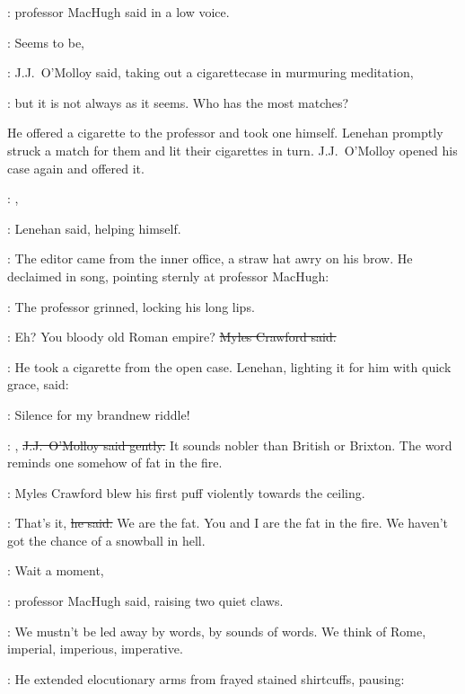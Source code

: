 :
professor MacHugh said in a low voice.

\jjom:
Seems to be,

:
J.J.~O'Molloy said,
taking out a cigarettecase in murmuring meditation,

\jjom:
but it is not always as it seems.
Who has the most matches?



He offered a cigarette to the professor and took one himself.
Lenehan promptly struck a match for them and lit their cigarettes in turn.
J.J.~O'Molloy opened his case again and offered it.

\lenehan:
,

:
Lenehan said,
helping himself.

:
The editor came from the inner office,
a straw hat awry on his brow.
He declaimed in song,
pointing sternly at professor MacHugh:



:
The professor grinned,
locking his long lips.

\crawford:
Eh?
You bloody old Roman empire?
\sout{Myles Crawford said.}

:
He took a cigarette from the open case.
Lenehan,
lighting it for him with quick grace,
said:

\lenehan:
Silence for my brandnew riddle!

\jjom:
,
\sout{J.J.~O'Molloy said gently.}
It sounds nobler than British or Brixton.
The word reminds one somehow of fat in the fire.

:
Myles Crawford blew his first puff
violently towards the ceiling.

\crawford:
That's it,
\sout{he said.}
We are the fat.
You and I are the fat in the fire.
We haven't got the chance of a snowball in hell.



\machugh:
Wait a moment,

:
professor MacHugh said,
raising two quiet claws.

\machugh:
We mustn't be led away by words,
by sounds of words.
We think of Rome,
imperial, imperious, imperative.

:
He extended elocutionary arms from frayed stained shirtcuffs,
pausing:

